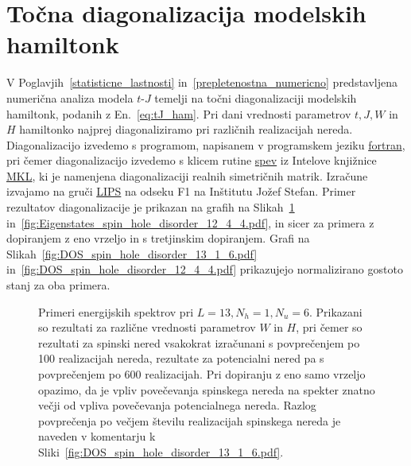\section{Točna diagonalizacija modelskih hamiltonk}
\label{diagonalizacija_metoda}
V Poglavjih~\ref{statisticne_lastnosti} in~\ref{prepletenostna_numericno} predstavljena numerična analiza modela $t$-$J$ temelji na točni diagonalizaciji modelskih hamiltonk, podanih z En.~\eqref{eq:tJ_ham}. Pri dani vrednosti parametrov $t, J, W$ in $H$ hamiltonko najprej diagonaliziramo pri različnih realizacijah nereda. Diagonalizacijo izvedemo s programom, napisanem v programskem jeziku \url{fortran}, pri čemer diagonalizacijo izvedemo s klicem rutine \url{spev} iz Intelove knjižnice \url{MKL}, ki je namenjena diagonalizaciji realnih simetričnih matrik. Izračune izvajamo na gruči \url{LIPS} na odseku F1 na Inštitutu Jožef Stefan. Primer rezultatov diagonalizacije je prikazan na grafih na Slikah~\ref{fig:Eigenstates_spin_hole_disorder_13_1_6.pdf} in~\ref{fig:Eigenstates_spin_hole_disorder_12_4_4.pdf}, in sicer za primera z dopiranjem z eno vrzeljo in s tretjinskim dopiranjem. Grafi na Slikah~\ref{fig:DOS_spin_hole_disorder_13_1_6.pdf} in~\ref{fig:DOS_spin_hole_disorder_12_4_4.pdf} prikazujejo normalizirano gostoto stanj za oba primera. 	
 \begin{figure}[H]
\caption{Primeri energijskih spektrov pri $L=13, N_h=1, N_u=6.$ Prikazani so rezultati za različne vrednosti parametrov $W$ in $H$, pri čemer so rezultati za spinski nered vsakokrat izračunani s povprečenjem po 100 realizacijah nereda, rezultate za potencialni nered pa s povprečenjem po 600 realizacijah. Pri dopiranju z eno samo vrzeljo opazimo, da je vpliv povečevanja spinskega nereda na spekter znatno večji od vpliva povečevanja potencialnega nereda. Razlog povprečenja po večjem številu realizacijah spinskega nereda je naveden v komentarju k Sliki~\ref{fig:DOS_spin_hole_disorder_13_1_6.pdf}.  }
\label{fig:Eigenstates_spin_hole_disorder_13_1_6.pdf}
\end{figure}
